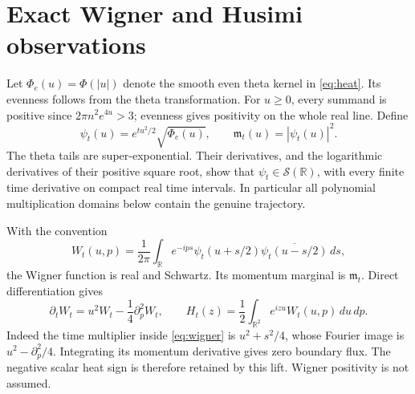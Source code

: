 \documentclass[11pt]{article}
\numberwithin{equation}{section}
\theoremstyle{definition}
\theoremstyle{remark}
\newcommand{\dd}{\,d}
\begin{document}
\section{Exact Wigner and Husimi observations}
\label{sec:lift}
Let $\Phi_e(u)=\Phi(|u|)$ denote the smooth even theta kernel in
\eqref{eq:heat}.
Its evenness follows from the theta transformation. For $u\ge0$, every
summand is positive since $2\pi n^2e^{4u}>3$; evenness gives positivity
on the whole real line. Define
\begin{equation}
 \psi_t(u)=e^{tu^2/2}\sqrt{\Phi_e(u)},\qquad
 \mathfrak m_t(u)=|\psi_t(u)|^2.
 \label{eq:wave}
\end{equation}
The theta tails are super-exponential. Their derivatives, and the
logarithmic derivatives of their positive square root, show that
$\psi_t\in\mathcal S(\mathbb R)$, with every finite time derivative
on compact real time intervals. In particular all polynomial
multiplication domains below contain the genuine trajectory.

With the convention
\begin{equation}
 W_t(u,p)=\frac1{2\pi}\int_{\mathbb R}e^{-ips}
     \psi_t(u+s/2)\overline{\psi_t(u-s/2)}\dd s,
 \label{eq:wigner}
\end{equation}
the Wigner function is real and Schwartz. Its momentum marginal is $\mathfrak m_t$.
Direct differentiation gives
\begin{equation}
 \partial_tW_t=u^2W_t-\frac14\partial_p^2W_t,
 \qquad H_t(z)=\frac12\int_{\mathbb R^2}e^{izu}W_t(u,p)\dd u\dd p.
 \label{eq:wigner-gen}
\end{equation}
Indeed the time multiplier inside \eqref{eq:wigner} is
$u^2+s^2/4$, whose Fourier image is $u^2-\partial_p^2/4$.
Integrating its momentum derivative gives zero boundary flux. The
negative scalar heat sign is therefore retained by this lift. Wigner
positivity is not assumed.
\end{document}
